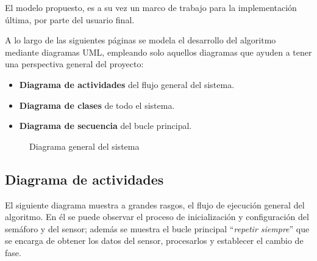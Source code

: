 El modelo propuesto, es a su vez un marco de trabajo para la implementación última, por parte del usuario final.

A lo largo de las siguientes páginas se modela el desarrollo del algoritmo mediante diagramas UML, empleando solo aquellos diagramas que ayuden a tener una perspectiva general del proyecto:
\begin{itemize}
	\item \textbf{Diagrama de actividades} del flujo general del sistema.
	\item \textbf{Diagrama de clases} de todo el sistema.
	\item \textbf{Diagrama de secuencia} del bucle principal.
\end{itemize}

\begin{figure}[H]
	\centering
	\caption{Diagrama general del sistema}
\end{figure}

\newpage
\subsection{Diagrama de actividades}
El siguiente diagrama muestra a grandes rasgos, el flujo de ejecución general del algoritmo. En él se puede observar el proceso de inicialización y configuración del semáforo y del sensor; además se muestra el bucle principal ``\emph{repetir siempre}'' que se encarga de obtener los datos del sensor, procesarlos y establecer el cambio de fase.


